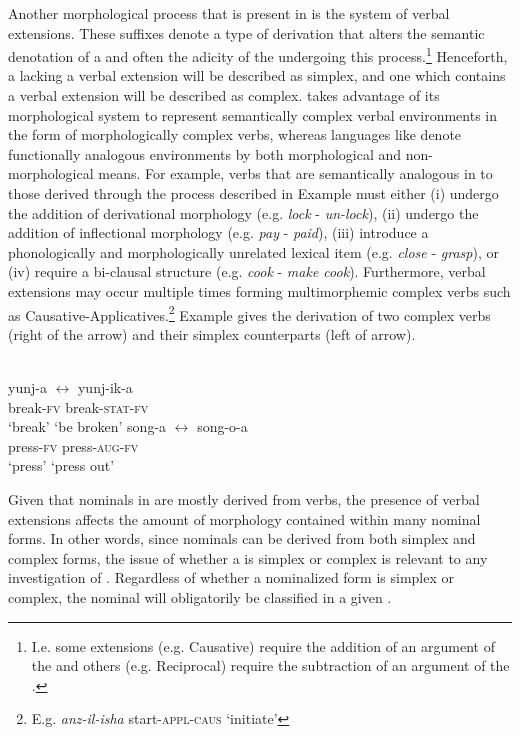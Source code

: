 \documentclass[output=paper,modfonts]{langscibook}
\begin{document}
Another morphological process that is present in  is the system of verbal extensions. These suffixes denote a type of derivation that alters the semantic denotation of a  and often the adicity of the  undergoing this process.{}\footnote{I.e. some extensions (e.g. Causative) require the addition of an argument of the  and others (e.g. Reciprocal) require the subtraction of an argument of the .} Henceforth, a  lacking a verbal extension will be described as simplex, and one which contains a verbal extension will be described as complex.  takes advantage of its morphological system to represent semantically complex verbal environments in the form of morphologically complex verbs, whereas languages like  denote functionally analogous environments by both morphological and non-morphological means. For example, verbs that are semantically analogous in  to those derived through the process described in Example  must either (i) undergo the addition of derivational morphology (e.g. \textit{lock} - \textit{un-lock}), (ii) undergo the addition of inflectional morphology (e.g. \textit{pay} - \textit{paid}), (iii) introduce a phonologically and morphologically unrelated lexical item (e.g. \textit{close} -\textit{ grasp}), or (iv) require a bi-clausal structure (e.g. \textit{cook} - \textit{make cook}). Furthermore, verbal extensions may occur multiple times forming multimorphemic complex verbs such as Causative-Applicatives.{}\footnote{E.g.  \textit{anz-il-isha}
  start-\textsc{appl}-\textsc{caus}
  ‘initiate’
} Example  gives the derivation of two complex verbs (right of the arrow) and their simplex counterparts (left of arrow).

\ea\label{ex:kloehn:2}
\\
\ea 
yunj-a $\leftrightarrow $ yunj-ik-a\\
break-\textsc{fv} break-\textsc{stat}-\textsc{fv}\\
\glt ‘break’ ‘be broken’
\ex 
song-a $\leftrightarrow $ song-o-a\\
press-\textsc{fv} press-\textsc{aug}-\textsc{fv}\\
\glt ‘press’ ‘press out’
\z
\z

Given that nominals in  are mostly derived from verbs, the presence of verbal extensions affects the amount of morphology contained within many nominal forms. In other words, since nominals can be derived from both simplex and complex  forms, the issue of whether a  is simplex or complex is relevant to any investigation of . Regardless of whether a nominalized form is simplex or complex, the nominal will obligatorily be classified in a given .
\end{document}
